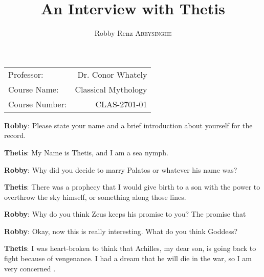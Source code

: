 \documentclass[12pt, a4paper]{article}
\author{Robby Renz \textsc{Abeysinghe}}
\title{An Interview with Thetis}
\begin{document}
\maketitle
\begin{center}
\begin{tabular}{l r}
Professor: & Dr. Conor Whately \\
Course Name: & Classical Mythology \\
Course Number: & CLAS-2701-01
\end{tabular}
\end{center}
\newpage

\textbf{Robby}: Please state your name and a brief introduction about yourself for the record.

\textbf{Thetis}: My Name is Thetis, and I am a sea nymph.

\textbf{Robby}: Why did you decide to marry Palatos or whatever his name was?

\textbf{Thetis}: There was a prophecy that I would give birth to a son with the power to overthrow the sky himself, or something along those lines.

\textbf{Robby}: Why do you think Zeus keeps his promise to you? The promise that 

\textbf{Robby}: Okay, now this is really interesting. What do you think Goddess?

\textbf{Thetis}: I was heart-broken to think that Achilles, my dear son, is going back to fight because of vengenance. I had a dream that he will die in the war, so I am very concerned \cite{wrath-of-thetis}.



\medskip
\newpage

\printbibliography
\end{document}

